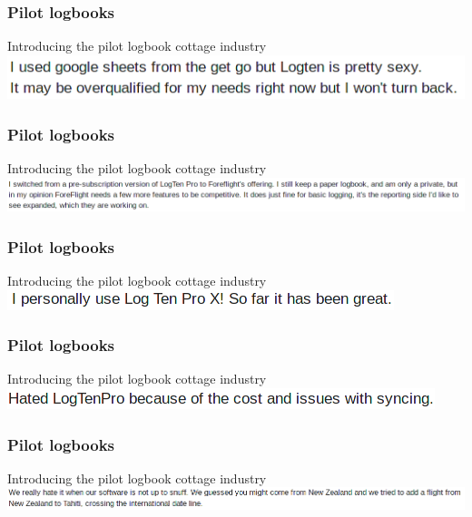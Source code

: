 \begin{frame}
\frametitle{Pilot logbooks}
\begin{block}{Introducing the pilot logbook cottage industry}
\includegraphics[height=0.1\textheight,natwidth=518,natheight=50]{image/logbook-2.png}
\end{block}
\end{frame}

\begin{frame}
\frametitle{Pilot logbooks}
\begin{block}{Introducing the pilot logbook cottage industry}
\includegraphics[height=0.08\textheight,natwidth=1024,natheight=76]{image/logbook-3.png}
\end{block}
\end{frame}

\begin{frame}
\frametitle{Pilot logbooks}
\begin{block}{Introducing the pilot logbook cottage industry}
\includegraphics[height=0.05\textheight,natwidth=426,natheight=22]{image/logbook-4.png}
\end{block}
\end{frame}

\begin{frame}
\frametitle{Pilot logbooks}
\begin{block}{Introducing the pilot logbook cottage industry}
\includegraphics[height=0.05\textheight,natwidth=471,natheight=23]{image/logbook-5.png}
\end{block}
\end{frame}

\begin{frame}
\frametitle{Pilot logbooks}
\begin{block}{Introducing the pilot logbook cottage industry}
\includegraphics[height=0.05\textheight,natwidth=1015,natheight=49]{image/logbook-6.png}
\end{block}
\end{frame}

